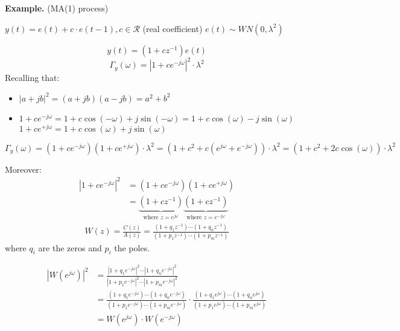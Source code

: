 \textbf{Example.} (MA(1) process)

$y(t)=e(t)+c \cdot e(t-1), c \in \mathcal{R}$ (real coefficient)
$e(t)\sim W N(0,\lambda^{2} )$

$$
y(t)=\left(1+c z^{-1}\right) e(t)
$$
$$
\Gamma_{y}(\omega)=\left|1+c e^{-j \omega}\right|^{2} \cdot \lambda^{2}
$$
Recalling that:
\begin{itemize}
	\item $|a+j b|^{2}=(a+j b)(a-j b)=a^{2}+b^{2}$
	\item $1+c e^{-j \omega}=1+c \cos (-\omega)+j \sin (-\omega)=1+c \cos (\omega)-j \sin (\omega)$ $1+c e^{+j \omega}=1+c \cos (\omega)+j \sin (\omega)$
\end{itemize}

$$
\Gamma_{y}(\omega)=\left(1+c e^{-j \omega}\right)\left(1+c e^{+j \omega}\right)\cdot \lambda^{2}=(1+c^{2}+c\left(e^{j \omega}+e^{-j \omega}\right))\cdot \lambda^{2}=(1+c^{2}+2 c \cos (\omega))\cdot \lambda^{2}
$$


Moreover:
\begin{align*}
	|1+c e^{-j \omega}|^2&=\left(1+c e^{-j \omega}\right)\left(1+c e^{+j \omega}\right)\\
	&=\underbrace{\left(1+c z^{-1}\right)}_\text{where $z=e^{j \omega}$}\underbrace{\left(1+c z^{-1}\right)}_\text{where $z=e^{-j \omega}$}
\end{align*}
\begin{align*}
	W(z)=\frac{C(z)}{A(z)}=\frac{(1+q_1z^{-1})\cdots(1+q_nz^{-1})}{(1+p_1z^{-1})\cdots(1+p_mz^{-1})}
\end{align*}
where $q_i$ are the zeros and $p_i$ the poles.

\begin{align*}
	\left|W\left(e^{j \omega}\right)\right|^{2}&=\frac{|1+q_1e^{-j \omega}|^2\cdots|1+q_ne^{-j \omega}|^2}{|1+p_1e^{-j \omega}|^2\cdots|1+p_me^{-j \omega}|^2}\\
	&=\frac{(1+q_1e^{-j \omega})\cdots(1+q_ne^{-j \omega})}{(1+p_1e^{-j \omega})\cdots(1+p_me^{-j \omega})}\cdot\frac{(1+q_1e^{j \omega})\cdots(1+q_ne^{j \omega})}{(1+p_1e^{j \omega})\cdots(1+p_me^{j \omega})}\\
			&=W\left(e^{j \omega}\right)\cdot W\left(e^{-j \omega}\right)
\end{align*}